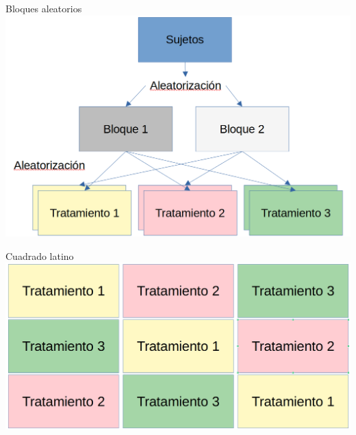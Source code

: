 \documentclass[
  11pt,
  ignorenonframetext,
]{beamer}
\begin{document}
\begin{frame}{Bloques aleatorios}
\protect\hypertarget{bloques-aleatorios}{}
\includegraphics{Figuras-disenos/Bloques.png}
\end{frame}

\begin{frame}{Cuadrado latino}
\protect\hypertarget{cuadrado-latino}{}
\includegraphics{Figuras-disenos/Cuadrado-latino.png}
\end{frame}
\end{document}
